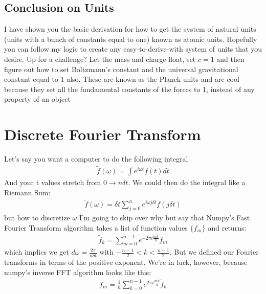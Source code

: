 \subsection{Conclusion on Units}
I have shown you the basic derivation for how to get the system of natural units (units with a bunch of constants equal to one)  known as atomic units.  Hopefully you can follow my logic to create any easy-to-derive-with system of units that you desire.  Up for a challenge?  Let the mass and charge float, set $c=1$ and then figure out how to set Boltzmann's constant and the universal gravitational constant equal to 1 also.  These are known as the Planck units and are cool because they set all the fundamental constants of the forces to 1, instead of any property of an object








\section{Discrete Fourier Transform}
Let's say you want a computer to do the following integral
\begin{align}
	\tilde{f} (\omega) = \int e^{i \omega t} f(t) dt
\end{align}
And your t values stretch from $0\rightarrow n \delta t$.  We could then do the integral like a Riemann Sum:
\begin{align}
	\tilde{f} (\omega) = \delta t \sum_{j=0}^{n}  e^{i \omega j \delta t} f( j \delta t )
\end{align}
but how to discretize $\omega$  I'm going to skip over why but say that Numpy's Fast Fourier Transform algorithm takes a list of function values $\{f_m\}$ and returns:
\begin{align}
	\tilde{f}_k = \sum_{m=0}^{n - 1}  e^{- 2 \pi i \frac{m k}{n}} f_m
\end{align}
which implies we get $d\omega = \frac{ 2 \pi }{n \delta t}$ with $-\frac{n-1}{2} < k < \frac{n-1}{2} $.  But we defined our Fourier transforms in terms of the positive exponent.  We're in luck, however, because numpy's inverse FFT algorithm looks like this:
\begin{align}
	 f_m = \frac{1}{n} \sum_{k=0}^{n - 1}  e^{2 \pi i \frac{m k}{n}} \tilde{f}_k
\end{align}


